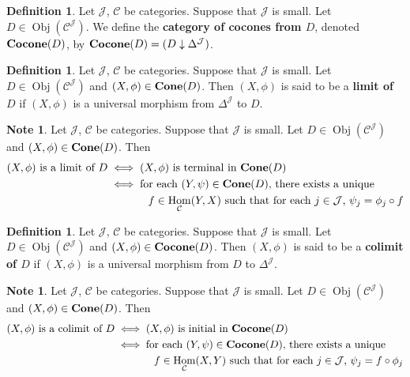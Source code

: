 \documentclass{book}
\theoremstyle{definition}
\newtheorem{defn}[definition]{Definition}
\newtheorem{note}[definition]{Note}
\newcommand{\Del}{\Delta}
\newcommand{\MC}{\mathcal{C}}
\newcommand{\MJ}{\mathcal{J}}
\DeclareMathOperator{\Obj}{Obj}
\DeclareMathOperator{\Hom}{Hom}
\DeclareMathOperator*{\0}{\mbf{0}}
\DeclareMathOperator*{\1}{\mbf{1}}
\DeclareMathOperator*{\Cone}{\text{\tbf{Cone}}}
\DeclareMathOperator*{\Cocone}{\text{\tbf{Cocone}}}
\newcommand{\tbf}[1]{\textbf{#1}}
\begin{document}
	\begin{defn}
		Let $\MJ$, $\MC$ be categories. Suppose that $\MJ$ is small. Let $D \in \Obj(\MC^{\MJ})$. We define the \textbf{category of cocones from $D$}, denoted $\Cocone(D)$, by $\Cocone(D) = (D \downarrow \Del^{\MJ})$.
	\end{defn}

	\begin{defn}
		Let $\MJ$, $\MC$ be categories. Suppose that $\MJ$ is small. Let $D \in \Obj(\MC^{\MJ})$ and $(X, \phi) \in \Cone(D)$. Then $(X, \phi)$ is said to be a \textbf{limit of $D$} if $(X, \phi)$ is a universal morphism from $\Del^{\MJ}$ to $D$.  
	\end{defn}



	\begin{note}
		Let $\MJ$, $\MC$ be categories. Suppose that $\MJ$ is small. Let $D \in \Obj(\MC^{\MJ})$ and $(X, \phi) \in \Cone(D)$. Then 
		\begin{align*}
			\text{$(X, \phi)$  is a limit of $D$} 
			& \iff \text{$(X, \phi)$ is terminal in $\Cone(D)$} \\
			& \iff \text{for each $(Y, \psi) \in \Cone(D)$, there exists a unique} \\
			& \hspace{1.3cm }\text{$f \in \Hom_{\MC}(Y, X)$ such that for each $j \in \MJ$, $\psi_j = \phi_j \circ f$}
		\end{align*} 
	\end{note} 


	\begin{defn}
		Let $\MJ$, $\MC$ be categories. Suppose that $\MJ$ is small. Let $D \in \Obj(\MC^{\MJ})$ and $(X, \phi) \in \Cocone(D)$. Then $(X, \phi)$ is said to be a \textbf{colimit of $D$} if $(X, \phi)$ is a universal morphism from $D$ to $\Del^{\MJ}$.  
	\end{defn}

	\begin{note}
		Let $\MJ$, $\MC$ be categories. Suppose that $\MJ$ is small. Let $D \in \Obj(\MC^{\MJ})$ and $(X, \phi) \in \Cone(D)$. Then 
		\begin{align*}
			\text{$(X, \phi)$  is a colimit of $D$} 
			& \iff \text{$(X, \phi)$ is initial in $\Cocone(D)$} \\
			& \iff \text{for each $(Y, \psi) \in \Cocone(D)$, there exists a unique} \\
			& \hspace{1.3cm }\text{$f \in \Hom_{\MC}(X, Y)$ such that for each $j \in \MJ$, $\psi_j = f \circ \phi_j $}
		\end{align*} 
	\end{note} 
\end{document}
